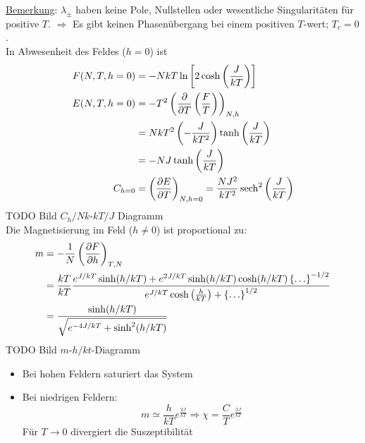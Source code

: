 \begin{enumerate}[A)]
    \underline{Bemerkung}: $\lambda_\pm$ haben keine Pole, Nullstellen oder wesentliche Singularitäten für positive $T$.
    $\Rightarrow$ Es gibt keinen Phasenübergang bei einem positiven $T$-wert; $T_c = 0$. \\
    In Abwesenheit des Feldes ($h=0$) ist
    \begin{equation}
        \begin{split}
            F(N, T, h=0) &= - N k T \ln \left[ 2 \cosh \left( \frac{J}{k T} \right) \right] \\
            E(N, T, h=0) &= - T^2 \left( \frac{\partial}{\partial T} \left( \frac{F}{T} \right)  \right)_{N, h} \\
            &= N k T^2 \left( - \frac{J}{k T^2} \right) \tanh \left( \frac{J}{k T} \right)  \\
            &= - N J \tanh \left( \frac{J}{k T} \right) \\
            C_{h=0} &= \left( \frac{\partial E}{\partial T} \right)_{N, h=0} = \frac{N J^2}{k T^2} \operatorname{sech}^2 \left( \frac{J}{k T} \right)
        \end{split}
    \end{equation}
    TODO Bild $C_h/Nk$-$kT/J$ Diagramm \\%
    Die Magnetisierung im Feld ($h \neq 0$) ist proportional zu:
    \begin{equation}
        \begin{split}
            m &= - \frac{1}{N} \left( \frac{\partial F}{\partial h} \right)_{T, N} \\
            &= \frac{k T}{k T} \frac{e^{J/kT} \sinh(h/kT) +e^{2J/kT} \sinh (h/kT) \cosh (h/kT) \left\{ \ldots \right\}^{-1/2}}{e^{J / k T} \cosh \left( \frac{h}{k T} \right) + \left\{ \ldots \right\}^{1/2}} \\
            &= \frac{\sinh (h / k T)}{\sqrt{e^{-4 J / k T} + \sinh^2 (h/k T)}}
        \end{split}
    \end{equation}
    TODO Bild $m$-$h/kt$-Diagramm %
    \begin{itemize}
        \item Bei hohen Feldern saturiert das System
        \item Bei niedrigen Feldern:
        \begin{equation}
            m \simeq \frac{h}{k T} e^{\frac{2 J}{k T}} \Rightarrow \chi = \frac{C}{T} e^{\frac{2J}{k T}}
        \end{equation}
        Für $T \to 0$ divergiert die Suszeptibilität
    \end{itemize}

\end{enumerate}
